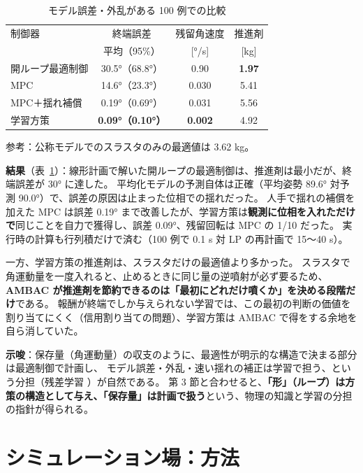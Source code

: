 \documentclass[paper=a4paper,fontsize=10pt,twocolumn,column_gap=2zw,line_length=24zw,number_of_lines=46,head_space=20mm]{jlreq}
\begin{document}
\begin{table}[t]\centering\small
\caption{モデル誤差・外乱がある 100 例での比較}\label{tab:robust}
\setlength{\tabcolsep}{4pt}\begin{tabular}{lccc}\toprule
制御器 & 終端誤差 & 残留角速度 & 推進剤 \\
 & 平均（95\%） & [°/s] & [kg] \\\midrule
開ループ最適制御 & 30.5°（68.8°） & 0.90 & \textbf{1.97} \\
MPC & 14.6°（23.3°） & 0.030 & 5.41 \\
MPC＋揺れ補償 & 0.19°（0.69°） & 0.031 & 5.56 \\
学習方策 & \textbf{0.09°（0.10°）} & \textbf{0.002} & 4.92 \\\bottomrule
\end{tabular}
\vspace{1pt}\par\footnotesize 参考：公称モデルでのスラスタのみの最適値は 3.62 kg。
\end{table}

\textbf{結果}（表~\ref{tab:robust}）：線形計画で解いた開ループの最適制御は、推進剤は最小だが、終端誤差が 30° に達した。
平均化モデルの予測自体は正確（平均姿勢 89.6° 対予測 90.0°）で、誤差の原因は止まった位相での揺れだった。
人手で揺れの補償を加えた MPC は誤差 0.19° まで改善したが、学習方策は\textbf{観測に位相を入れただけで}同じことを自力で獲得し、誤差 0.09°、残留回転は MPC の 1/10 だった。
実行時の計算も行列積だけで済む（100 例で 0.1 s 対 LP の再計画で 15〜40 s）。

一方、学習方策の推進剤は、スラスタだけの最適値より多かった。
スラスタで角運動量を一度入れると、止めるときに同じ量の逆噴射が必ず要るため、\textbf{AMBAC が推進剤を節約できるのは「最初にどれだけ噴くか」を決める段階だけ}である。
報酬が終端でしか与えられない学習では、この最初の判断の価値を割り当てにくく（信用割り当ての問題）、学習方策は AMBAC で得をする余地を自ら消していた。

\textbf{示唆}：保存量（角運動量）の収支のように、最適性が明示的な構造で決まる部分は最適制御で計画し、
モデル誤差・外乱・速い揺れの補正は学習で担う、という分担（残差学習 \cite{johannink2019}）が自然である。
第 3 節と合わせると、\textbf{「形」（ループ）は方策の構造として与え、「保存量」は計画で扱う}という、物理の知識と学習の分担の指針が得られる。


\section{シミュレーション場：方法}
\end{document}
